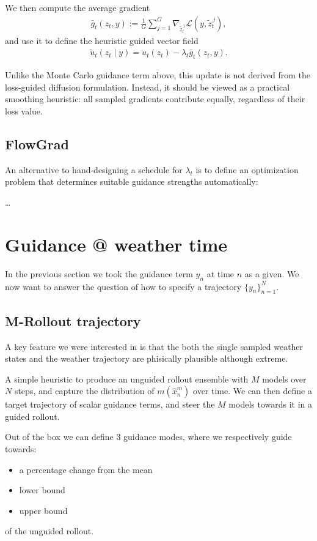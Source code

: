 \documentclass[a4paper,12pt]{article}
\begin{document}
We then compute the average gradient
\begin{align*}
\bar{g}_t(z_t,y)
:=
\frac{1}{G}\sum_{j=1}^G
\nabla_{\tilde{z}_t^{\,j}} \mathcal{L}(y,\tilde{z}_t^{\,j}),
\end{align*}
and use it to define the heuristic guided vector field
\begin{align*}
\tilde{u}_t(z_t \mid y)
=
u_t(z_t) - \lambda_t \bar{g}_t(z_t,y).
\end{align*}

Unlike the Monte Carlo guidance term above, this update is not derived from the loss-guided diffusion formulation.
Instead, it should be viewed as a practical smoothing heuristic: all sampled gradients contribute equally, regardless of their loss value.

\subsection{FlowGrad}

An alternative to hand-designing a schedule for $\lambda_t$ is to define an optimization problem that determines suitable guidance strengths automatically:

\ldots

\clearpage
\section{Guidance @ weather time}
In the previous section we took the guidance term $y_n$ at time $n$ as a given.
We now want to answer the question of how to specify a trajectory $\{y_n\}_{n=1}^N$.

\subsection{M-Rollout trajectory}
A key feature we were interested in is that the both the single sampled weather states and the weather trajectory are phisically plausible although extreme.

A simple heuristic to produce an unguided rollout ensemble with $M$ models over $N$ steps, and capture the distribution of $m(\hat{x}_n^m)$ over time. We can then define a target trajectory of scalar guidance terms,
and steer the $M$ models towards it in a guided rollout. 

Out of the box we can define 3 guidance modes, where we respectively guide towards:
\begin{itemize}[noitemsep]
    \item a percentage change from the mean
    \item lower bound
    \item upper bound
\end{itemize}
of the unguided rollout.
\end{document}
